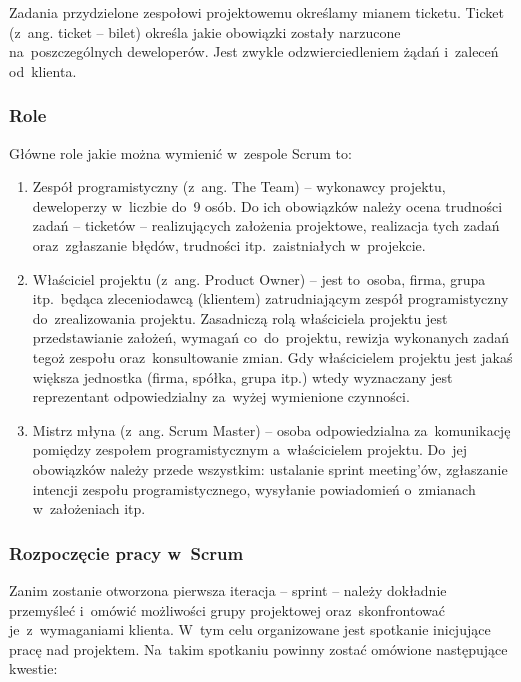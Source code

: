 \begin{definition}[Ticket]
Zadania przydzielone zespołowi projektowemu określamy mianem ticketu. Ticket (z~ang. ticket -- bilet) określa jakie obowiązki zostały narzucone na~poszczególnych deweloperów. Jest zwykle odzwierciedleniem żądań i~zaleceń od~klienta.
\end{definition}

\subsubsection{Role} \label{scrum.role}

Główne role jakie można wymienić w~zespole Scrum to:

\begin{enumerate}
  \item Zespół programistyczny (z~ang. The Team) -- wykonawcy projektu, deweloperzy w~liczbie do~9 osób. Do ich obowiązków należy ocena trudności zadań -- ticketów -- realizujących założenia projektowe, realizacja tych zadań oraz~zgłaszanie błędów, trudności itp.~zaistniałych w~projekcie.
  \item Właściciel projektu (z~ang. Product Owner) -- jest to~osoba, firma, grupa itp.~będąca zleceniodawcą (klientem) zatrudniającym zespół programistyczny do~zrealizowania projektu. Zasadniczą rolą właściciela projektu jest przedstawianie założeń, wymagań co~do~projektu, rewizja wykonanych zadań tegoż zespołu oraz~konsultowanie zmian. Gdy właścicielem projektu jest jakaś większa jednostka (firma, spółka, grupa itp.) wtedy wyznaczany jest reprezentant odpowiedzialny za~wyżej wymienione czynności.
  \item Mistrz młyna (z~ang. Scrum Master) -- osoba odpowiedzialna za~komunikację pomiędzy zespołem programistycznym a~właścicielem projektu. Do~jej obowiązków należy przede wszystkim: ustalanie sprint meeting'ów, zgłaszanie intencji zespołu programistycznego, wysyłanie powiadomień o~zmianach w~założeniach itp.
\end{enumerate}

\subsubsection{Rozpoczęcie pracy w~Scrum} \label{scrum.poczatki}

Zanim zostanie otworzona pierwsza iteracja -- sprint -- należy dokładnie przemyśleć i~omówić możliwości grupy projektowej oraz~skonfrontować je~z~wymaganiami klienta. W~tym celu organizowane jest spotkanie inicjujące pracę nad projektem. Na~takim spotkaniu powinny zostać omówione następujące kwestie:

